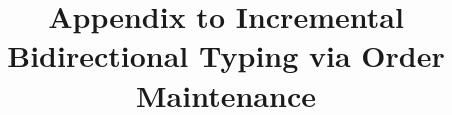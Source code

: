 \documentclass[acmsmall,dvipsnames,10pt,nonacm]{acmart}\settopmatter{printfolios=true}
\begin{document}
\title{Appendix to Incremental Bidirectional Typing via Order Maintenance}

\appendix

\maketitle

\end{document}
